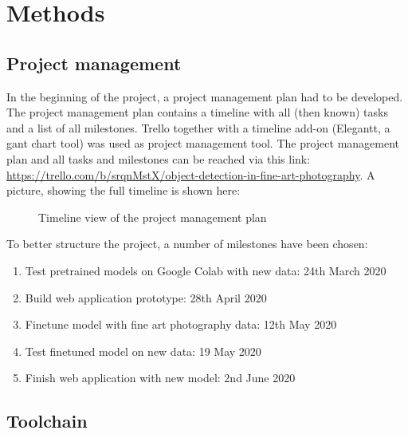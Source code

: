 \chapter{Methods}

\section{Project management}

In the beginning of the project, a project management plan had to be developed. The project management plan contains a timeline with all (then known) tasks and a list of all milestones. Trello together with a timeline add-on (Elegantt, a gant chart tool) was used as project management tool. The project management plan and all tasks and milestones can be reached via this link: \url{https://trello.com/b/srqnMstX/object-detection-in-fine-art-photography}. A picture, showing the full timeline is shown here:

 \begin{figure}
	\caption{\label{fig:project-management-plan} Timeline view of the project management plan}
\end{figure}

To better structure the project, a number of milestones have been chosen:

\begin{enumerate}
	\item Test pretrained models on Google Colab with new data: 24th March 2020
	\item Build web application prototype: 28th April 2020
	\item Finetune model with fine art photography data: 12th May 2020
	\item Test finetuned model on new data: 19 May 2020
	\item Finish web application with new model: 2nd June 2020
\end{enumerate}

\section{Toolchain}

